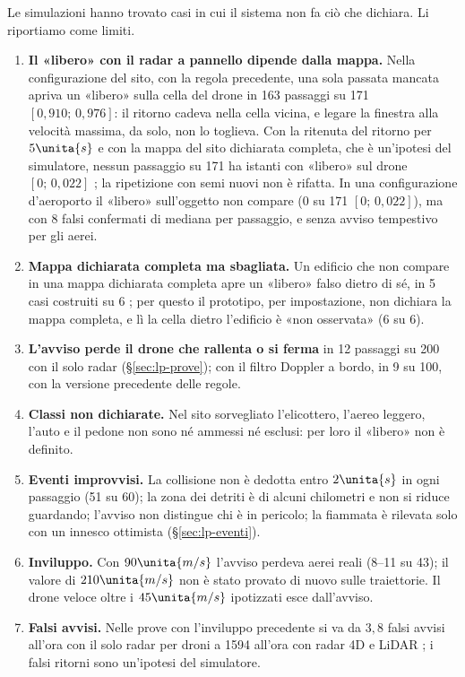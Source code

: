 Le simulazioni hanno trovato casi in cui il sistema non fa ciò che dichiara. Li riportiamo come limiti.
\begin{enumerate}[label=\arabic*.]
\item \textbf{Il «libero» con il radar a pannello dipende dalla mappa.} Nella configurazione del sito, con la regola precedente, una sola passata mancata apriva un «libero» sulla cella del drone in 163 passaggi su 171 $[0{,}910;\,0{,}976]$: il ritorno cadeva nella cella vicina, e legare la finestra alla velocità massima, da solo, non lo toglieva. Con la ritenuta del ritorno per $5\unita{s}$ e con la mappa del sito dichiarata completa, che è un'ipotesi del simulatore, nessun passaggio su 171 ha istanti con «libero» sul drone $[0;\,0{,}022]$ ; la ripetizione con semi nuovi non è rifatta. In una configurazione d'aeroporto il «libero» sull'oggetto non compare (0 su 171 $[0;\,0{,}022]$), ma con 8 falsi confermati di mediana per passaggio, e senza avviso tempestivo per gli aerei.
\item \textbf{Mappa dichiarata completa ma sbagliata.} Un edificio che non compare in una mappa dichiarata completa apre un «libero» falso dietro di sé, in 5 casi costruiti su 6 ; per questo il prototipo, per impostazione, non dichiara la mappa completa, e lì la cella dietro l'edificio è «non osservata» (6 su 6).
\item \textbf{L'avviso perde il drone che rallenta o si ferma} in 12 passaggi su 200 con il solo radar (\S\ref{sec:lp-prove}); con il filtro Doppler a bordo, in 9 su 100, con la versione precedente delle regole.
\item \textbf{Classi non dichiarate.} Nel sito sorvegliato l'elicottero, l'aereo leggero, l'auto e il pedone non sono né ammessi né esclusi: per loro il «libero» non è definito.
\item \textbf{Eventi improvvisi.} La collisione non è dedotta entro $2\unita{s}$ in ogni passaggio (51 su 60); la zona dei detriti è di alcuni chilometri e non si riduce guardando; l'avviso non distingue chi è in pericolo; la fiammata è rilevata solo con un innesco ottimista (\S\ref{sec:lp-eventi}).
\item \textbf{Inviluppo.} Con $90\unita{m/s}$ l'avviso perdeva aerei reali (8--11 su 43); il valore di $210\unita{m/s}$ non è stato provato di nuovo sulle traiettorie. Il drone veloce oltre i $45\unita{m/s}$ ipotizzati esce dall'avviso.
\item \textbf{Falsi avvisi.} Nelle prove con l'inviluppo precedente si va da $3{,}8$ falsi avvisi all'ora con il solo radar per droni a 1594 all'ora con radar 4D e LiDAR ; i falsi ritorni sono un'ipotesi del simulatore.
\end{enumerate}

